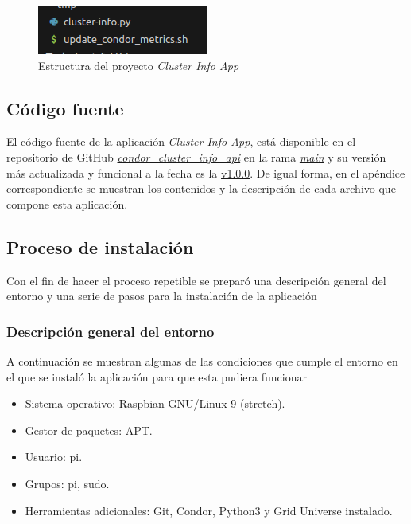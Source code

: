\begin{figure}[H]
	\centering
	\includegraphics[scale=0.35]{tablas-images/pmv/estructura-proyecto-cluster-info-app.png}
	\caption{Estructura del proyecto \textit{Cluster Info App}}
	\label{fig:estructura-proyecto-cluster-info-app}
\end{figure}

\subsection{Código fuente}

\noindent
El código fuente de la aplicación \textit{Cluster Info App}, está disponible en el repositorio de GitHub \href{https://github.com/JuanEstebanOsma1012/condor\_cluster\_info\_api}{\textit{condor\_cluster\_info\_api}} en la rama \href{https://github.com/JuanEstebanOsma1012/condor\_cluster\_info\_api/tree/main}{\textit{main}} y su versión más actualizada y funcional a la fecha es la \href{https://github.com/JuanEstebanOsma1012/condor\_cluster\_info\_api/releases/tag/v1.0.0}{v1.0.0}. De igual forma, en el apéndice correspondiente se muestran los contenidos y la descripción de cada archivo que compone esta aplicación.

\subsection{Proceso de instalación}
\noindent

Con el fin de hacer el proceso repetible se preparó una descripción general del entorno y una serie de pasos para la instalación de la aplicación

\subsubsection{Descripción general del entorno}
\noindent
A continuación se muestran algunas de las condiciones que cumple el entorno en el que se instaló la aplicación para que esta pudiera funcionar

\begin{itemize}
	\item Sistema operativo: Raspbian GNU/Linux 9 (stretch).
	\item Gestor de paquetes: APT.
	\item Usuario: pi.
	\item Grupos: pi, sudo.
	\item Herramientas adicionales: Git, Condor, Python3 y Grid Universe instalado.
\end{itemize}

